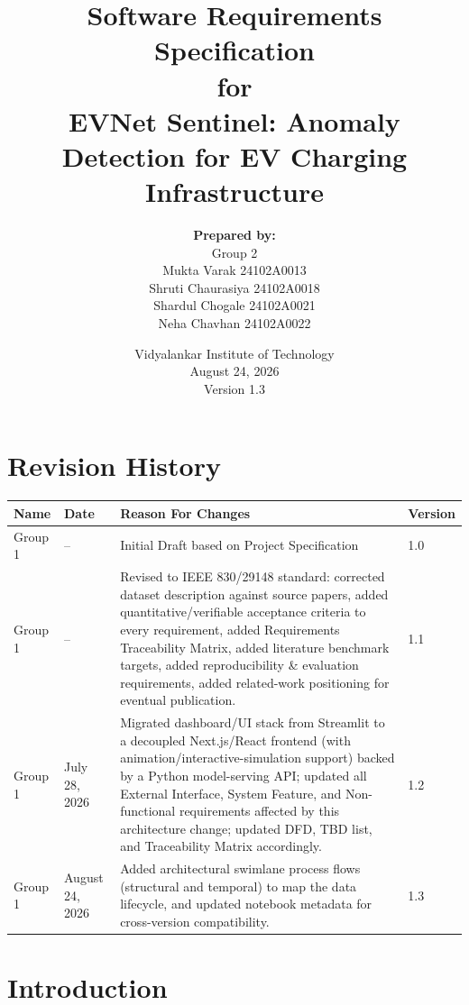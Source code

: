 \documentclass[11pt, a4paper]{article}
\title{\textbf{Software Requirements Specification}\\ \vspace{0.5cm} for \\ \vspace{0.5cm} \textbf{EVNet Sentinel: Anomaly Detection for EV Charging Infrastructure}}
\author{\textbf{Prepared by:} \\ Group 2 \\ Mukta Varak 24102A0013 \\ Shruti Chaurasiya 24102A0018 \\ Shardul Chogale 24102A0021 \\ Neha Chavhan 24102A0022}
\date{Vidyalankar Institute of Technology \\ August 24, 2026 \\ Version 1.3}
\begin{document}
\maketitle
\thispagestyle{empty}
\newpage

\section*{Revision History}
\begin{tabularx}{\textwidth}{|l|l|X|l|}
\hline
\textbf{Name} & \textbf{Date} & \textbf{Reason For Changes} & \textbf{Version} \\ \hline
Group 1 & -- & Initial Draft based on Project Specification & 1.0 \\ \hline
Group 1 & -- & Revised to IEEE 830/29148 standard: corrected dataset description against source papers, added quantitative/verifiable acceptance criteria to every requirement, added Requirements Traceability Matrix, added literature benchmark targets, added reproducibility \& evaluation requirements, added related-work positioning for eventual publication. & 1.1 \\ \hline
Group 1 & July 28, 2026 & Migrated dashboard/UI stack from Streamlit to a decoupled Next.js/React frontend (with animation/interactive-simulation support) backed by a Python model-serving API; updated all External Interface, System Feature, and Non-functional requirements affected by this architecture change; updated DFD, TBD list, and Traceability Matrix accordingly. & 1.2 \\ \hline
Group 1 & August 24, 2026 & Added architectural swimlane process flows (structural and temporal) to map the data lifecycle, and updated notebook metadata for cross-version compatibility. & 1.3 \\ \hline
\end{tabularx}
\newpage

\tableofcontents
\newpage

\section{Introduction}
\end{document}
